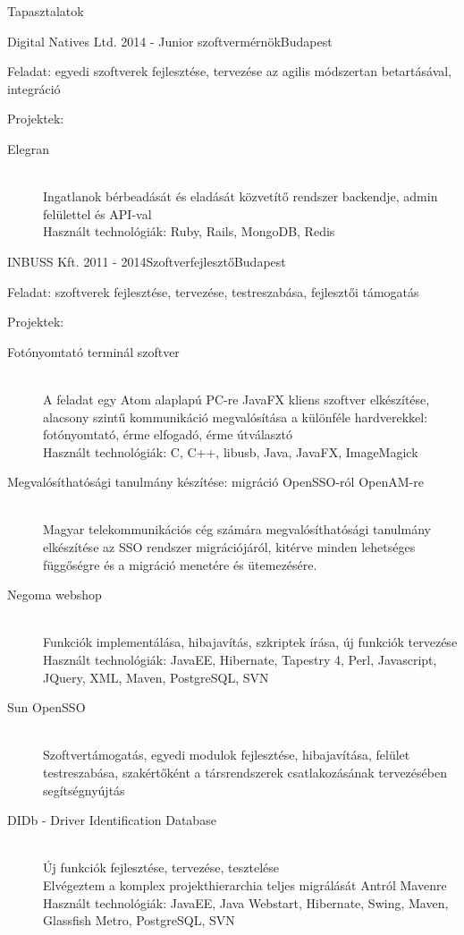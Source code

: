 \documentclass{resume} %
\begin{document}
\begin{rSection}{Tapasztalatok}

\begin{rSubsection}{Digital Natives Ltd.}
{2014 - }{Junior szoftvermérnök}{Budapest}
\item Feladat: egyedi szoftverek fejlesztése, tervezése az agilis módszertan betartásával, integráció
\item Projektek:
	\begin{description}
		\item[Elegran] \hfill \\
		Ingatlanok bérbeadását és eladását közvetítő rendszer backendje, admin felülettel és API-val \\
		Használt technológiák: Ruby, Rails, MongoDB, Redis
	\end{description}
\end{rSubsection}

\begin{rSubsection}{INBUSS Kft.}
{2011 - 2014}{Szoftverfejlesztő}{Budapest}
\item Feladat: szoftverek fejlesztése, tervezése, testreszabása, fejlesztői támogatás
\item Projektek:
	\begin{description}
		\item[Fotónyomtató terminál szoftver] \hfill \\
		A feladat egy Atom alaplapú PC-re JavaFX kliens szoftver elkészítése, alacsony szintű kommunikáció
		megvalósítása a különféle hardverekkel: fotónyomtató, érme elfogadó, érme útválasztó \\
		Használt technológiák: C, C++, libusb, Java, JavaFX, ImageMagick
		\item[Megvalósíthatósági tanulmány készítése: migráció OpenSSO-ról OpenAM-re] \hfill \\
		Magyar telekommunikációs cég számára megvalósíthatósági tanulmány elkészítése az SSO rendszer migrációjáról,
		kitérve minden lehetséges függőségre és a migráció menetére és ütemezésére.
		\item[Negoma webshop] \hfill \\
		Funkciók implementálása, hibajavítás, szkriptek írása, új funkciók tervezése \\
		Használt technológiák: JavaEE, Hibernate, Tapestry 4, Perl, Javascript, JQuery, XML, Maven, PostgreSQL, SVN
		\item[Sun OpenSSO] \hfill \\
		Szoftvertámogatás, egyedi modulok fejlesztése, hibajavítása, felület testreszabása,
		szakértőként a társrendszerek csatlakozásának tervezésében segítségnyújtás
		\item[DIDb - Driver Identification Database] \hfill \\
		Új funkciók fejlesztése, tervezése, tesztelése \\
		Elvégeztem a komplex projekthierarchia teljes migrálását Antról Mavenre \\
		Használt technológiák: JavaEE, Java Webstart, Hibernate, Swing, Maven, Glassfish Metro, PostgreSQL, SVN \\
	\end{description}
\end{rSubsection}


\end{rSection}
\end{document}
